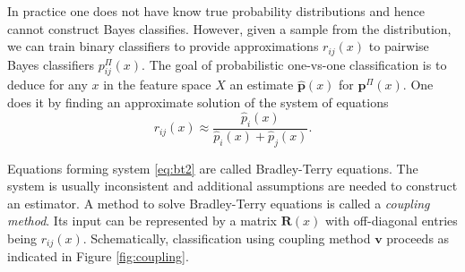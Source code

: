 \documentclass[twoside,11pt]{article}
\begin{document}
In practice one does not have know true probability distributions and hence cannot construct Bayes classifies. However, given a sample from the distribution, we can train binary classifiers to provide approximations $r_{ij}(x)$ to pairwise Bayes classifiers $p_{ij}^\Pi(x)$. The goal of probabilistic one-vs-one classification is to deduce for any $x$ in the feature space $X$ an estimate $\hat{\boldsymbol{p}}(x)$ for $\boldsymbol{p}^\Pi(x)$. One does it by finding an approximate solution of the system of equations
%
%
%
%
%
%
%
%
\begin{equation}
	{r}_{ij}(x) \approx \frac {\hat p_i(x)}{\hat p_i(x) + \hat p_j(x)}. \label{eq:bt2}
\end{equation}


Equations forming system \eqref{eq:bt2} are called Bradley-Terry equations.
The system is usually inconsistent and additional assumptions are needed to construct an estimator. A method to solve Bradley-Terry equations is called a \emph{coupling method}. Its input can be represented by a matrix $\boldsymbol{R}(x)$ with off-diagonal entries being $r_{ij}(x)$. Schematically, classification using coupling method $\boldsymbol{v}$ proceeds as indicated in Figure \ref{fig:coupling}.
\end{document}

